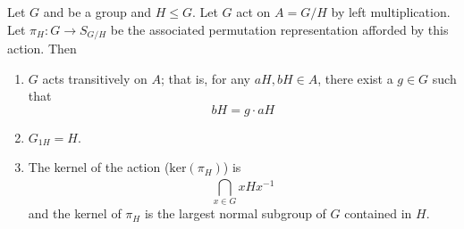 \begin{theorem}[ ]
    Let \( G  \) and be a group and \( H \leq G  \). Let \( G  \) act on \( A = G / H  \) by left multiplication. Let \( {\pi}_{H} : G \to {S}_{G /H}  \) be the associated permutation representation afforded by this action. Then 
    \begin{enumerate}
        \item[(1)] \( G  \) acts transitively on \( A  \); that is, for any \( aH , b H \in A  \), there exist a \( g \in G  \) such that  
            \[  b H= g \cdot a H  \]
        \item[(2)] \( {G}_{1H} = H  \).
        \item[(3)] The kernel of the action (\( \text{ker}({\pi}_{H}) \)) is 
            \[  \bigcap_{  x \in G  }^{  }  x H x^{-1}  \]
            and the kernel of \( \pi_{H}  \) is the largest normal subgroup of \( G  \) contained in \( H  \).
    \end{enumerate}
\end{theorem}
